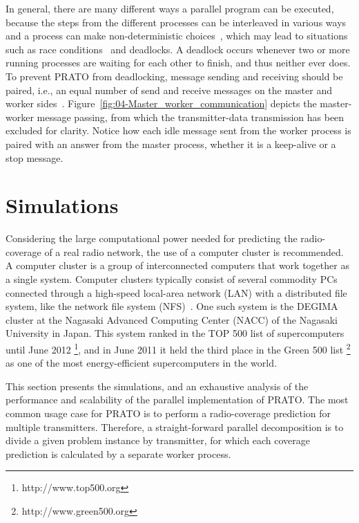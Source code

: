 In general, there are many different ways a parallel program can be
executed, because the steps from the different processes can be interleaved
in various ways and a process can make non-deterministic choices~\cite{Siegel_Verification_of_halting_properties_for_MPI_programs:2007},
which may lead to situations such as race conditions~\cite{Clemencon_MPI_Race_detection:1995}
and deadlocks. A deadlock occurs whenever two or more running processes
are waiting for each other to finish, and thus neither ever does.
To prevent PRATO from deadlocking, message sending and receiving should
be paired, i.e., an equal number of send and receive messages on the
master and worker sides~\cite{Siegel_Verification_of_halting_properties_for_MPI_programs:2007}.
Figure~\ref{fig:04-Master_worker_communication} depicts the master-worker
message passing, from which the transmitter-data transmission has
been excluded for clarity. Notice how each idle message sent from
the worker process is paired with an answer from the master process,
whether it is a keep-alive or a stop message.


\section{Simulations \label{sec:04-Simulations}}

Considering the large computational power needed for predicting the
radio-coverage of a real radio network, the use of a computer cluster
is recommended. A computer cluster is a group of interconnected computers
that work together as a single system. Computer clusters typically
consist of several commodity PCs connected through a high-speed local-area
network (LAN) with a distributed
file system, like the network file system (NFS)~\cite{Shepler_Network_file_system:2003}.
One such system is the DEGIMA cluster \cite{Hamada_Cluster_of_GPUs:2010}
at the Nagasaki Advanced Computing Center (NACC)
of the Nagasaki University in Japan. This system ranked in the TOP
500 list of supercomputers until June 2012%
\footnote{http://www.top500.org%
}, and in June 2011 it held the third place in the Green 500 list%
\footnote{http://www.green500.org%
} as one of the most energy-efficient supercomputers in the world.

This section presents the simulations, and an exhaustive analysis
of the performance and scalability of the parallel implementation
of PRATO. The most common usage case for PRATO is to perform a radio-coverage
prediction for multiple transmitters. Therefore, a straight-forward
parallel decomposition is to divide a given problem instance by transmitter,
for which each coverage prediction is calculated by a separate worker
process.

